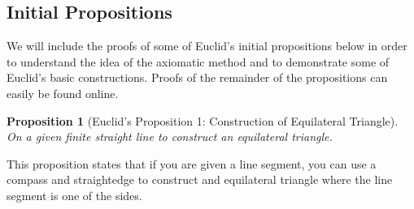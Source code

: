 \documentclass[
]{book}
\newtheorem{proposition}{Proposition}[chapter]
\theoremstyle{definition}
\theoremstyle{definition}
\theoremstyle{definition}
\theoremstyle{definition}
\theoremstyle{remark}
\begin{document}
\hypertarget{initial-propositions}{%
\subsection{Initial Propositions}\label{initial-propositions}}

We will include the proofs of some of Euclid's initial propositions below in order to understand the idea of the axiomatic method and to demonstrate some of Euclid's basic constructions. Proofs of the remainder of the propositions can easily be found online.

\begin{proposition}[Euclid's Proposition 1: Construction of Equilateral Triangle]
\protect\hypertarget{prp:prop1}{}\label{prp:prop1}On a given finite straight line to construct an equilateral triangle.
\end{proposition}

This proposition states that if you are given a line segment, you can use a compass and straightedge to construct and equilateral triangle where the line segment is one of the sides.
\end{document}
